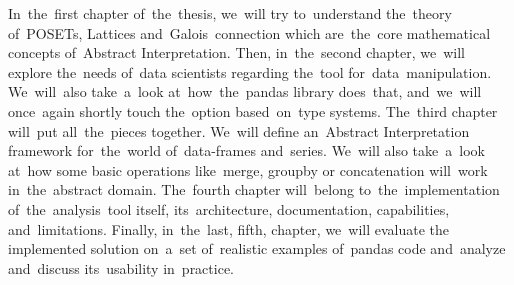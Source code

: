 In~the~first chapter of~the~thesis, we~will try to~understand the~theory of~POSETs, Lattices and~Galois~connection which
are~the~core mathematical concepts of~Abstract Interpretation.
Then, in~the~second chapter, we~will explore the~needs of~data scientists regarding the~tool for~data~manipulation.
We~will~also take~a~look at~how~the~pandas library does~that, and~we~will once~again shortly touch the~option based~on~type
systems.
The~third chapter will~put all~the~pieces together.
We~will define an~Abstract Interpretation framework for~the~world of~data-frames and~series.
We~will also take~a~look at~how some basic operations like~merge, groupby or concatenation will~work in~the~abstract domain.
The~fourth chapter will~belong to~the~implementation of~the~analysis~tool itself, its~architecture, documentation,
capabilities, and~limitations.
Finally, in~the~last, fifth, chapter, we~will evaluate the implemented solution on~a~set of~realistic examples of~pandas
code and~analyze and~discuss its~usability in~practice.